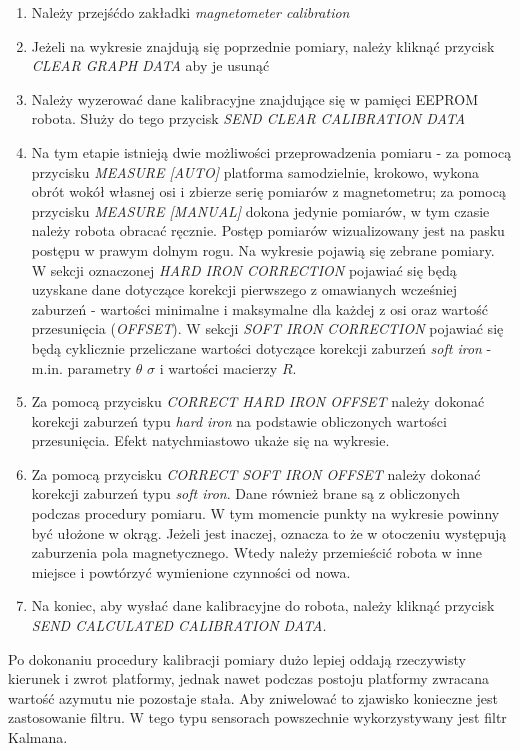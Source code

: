 \begin{enumerate}
    \item Należy przejśćdo zakładki \emph{magnetometer calibration}
    \item Jeżeli na wykresie znajdują się poprzednie pomiary, należy kliknąć przycisk \emph{CLEAR GRAPH DATA} aby je usunąć
    \item Należy wyzerować dane kalibracyjne znajdujące się w pamięci EEPROM robota. Służy do tego przycisk \emph{SEND CLEAR CALIBRATION DATA}
    \item Na tym etapie istnieją dwie możliwości przeprowadzenia pomiaru - za pomocą przycisku \emph{MEASURE [AUTO]} platforma samodzielnie, krokowo, wykona obrót wokół własnej osi i zbierze serię pomiarów z magnetometru; za pomocą przycisku \emph{MEASURE [MANUAL]} dokona jedynie pomiarów, w tym czasie należy robota obracać ręcznie. Postęp pomiarów wizualizowany jest na pasku postępu w prawym dolnym rogu. Na wykresie pojawią się zebrane pomiary. W sekcji oznaczonej \emph{HARD IRON CORRECTION} pojawiać się będą uzyskane dane dotyczące korekcji pierwszego z omawianych wcześniej zaburzeń - wartości minimalne i maksymalne dla każdej z osi oraz wartość przesunięcia (\emph{OFFSET}). W sekcji \emph{SOFT IRON CORRECTION} pojawiać się będą cyklicznie przeliczane wartości dotyczące korekcji zaburzeń \emph{soft iron} - m.in. parametry $\theta$ $\sigma$ i wartości macierzy $R$.
    \item Za pomocą przycisku \emph{CORRECT HARD IRON OFFSET} należy dokonać korekcji zaburzeń typu \emph{hard iron} na podstawie obliczonych wartości przesunięcia. Efekt natychmiastowo ukaże się na wykresie.
    \item Za pomocą przycisku \emph{CORRECT SOFT IRON OFFSET} należy dokonać korekcji zaburzeń typu \emph{soft iron}. Dane również brane są z obliczonych podczas procedury pomiaru. W tym momencie punkty na wykresie powinny być ułożone w okrąg. Jeżeli jest inaczej, oznacza to że w otoczeniu występują zaburzenia pola magnetycznego. Wtedy należy przemieścić robota w inne miejsce i powtórzyć wymienione czynności od nowa.
    \item Na koniec, aby wysłać dane kalibracyjne do robota, należy kliknąć przycisk \emph{SEND CALCULATED CALIBRATION DATA}. 
\end{enumerate}

Po dokonaniu procedury kalibracji pomiary dużo lepiej oddają rzeczywisty kierunek i zwrot platformy, jednak nawet podczas postoju platformy zwracana wartość azymutu nie pozostaje stała. Aby zniwelować to zjawisko konieczne jest zastosowanie filtru. W tego typu sensorach powszechnie wykorzystywany jest filtr Kalmana.

